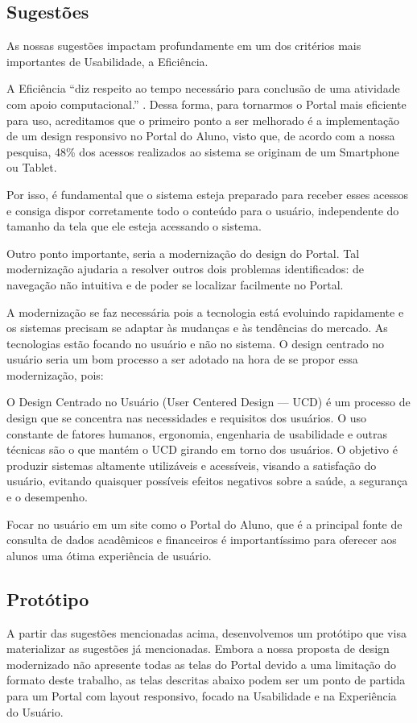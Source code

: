 \documentclass[12pt]{article}
\begin{document}
\subsection{Sugestões}
As nossas sugestões impactam profundamente em um dos critérios mais importantes de Usabilidade, a Eficiência.

A Eficiência “diz respeito ao tempo necessário para conclusão de uma atividade com apoio computacional.” \cite[p. ~53]{barbosa}. Dessa forma, para tornarmos o Portal mais eficiente para uso, acreditamos que o primeiro ponto a ser melhorado é a implementação de um design responsivo no Portal do Aluno, visto que, de acordo com a nossa pesquisa, 48\% dos acessos realizados ao sistema se originam de um Smartphone ou Tablet. 

Por isso, é fundamental que o sistema esteja preparado para receber esses acessos e consiga dispor corretamente todo o conteúdo para o usuário, independente do tamanho da tela que ele esteja acessando o sistema.

Outro ponto importante, seria a modernização do design do Portal. Tal modernização ajudaria a resolver outros dois problemas identificados: de navegação não intuitiva e de poder se localizar facilmente no Portal. 

A modernização se faz necessária pois a tecnologia está evoluindo rapidamente e os sistemas precisam se adaptar às mudanças e às tendências do mercado. As tecnologias estão focando no usuário e não no sistema. O design centrado no usuário seria um bom processo a ser adotado na hora de se propor essa modernização, pois:
\begin{quoting}[rightmargin=0cm,leftmargin=4cm]
{\footnotesize 
O Design Centrado no Usuário (User Centered Design — UCD) é um processo de design que se concentra nas necessidades e requisitos dos usuários. O uso constante de fatores humanos, ergonomia, engenharia de usabilidade e outras técnicas são o que mantém o UCD girando em torno dos usuários. 
O objetivo é produzir sistemas altamente utilizáveis e acessíveis, visando a satisfação do usuário, evitando quaisquer possíveis efeitos negativos sobre a saúde, a segurança e o desempenho. \cite{guimaraes}}
\end{quoting}
Focar no usuário em um site como o Portal do Aluno, que é a principal fonte de consulta de dados acadêmicos e financeiros é importantíssimo para oferecer aos alunos uma ótima experiência de usuário. 

\subsection{Protótipo}
A partir das sugestões mencionadas acima, desenvolvemos um protótipo que visa materializar as sugestões já mencionadas.  Embora a nossa proposta de design modernizado não apresente todas as telas do Portal devido a uma limitação do formato deste trabalho, as telas descritas abaixo podem ser um ponto de partida para um Portal com layout responsivo, focado na Usabilidade e na Experiência do Usuário.
\end{document}
